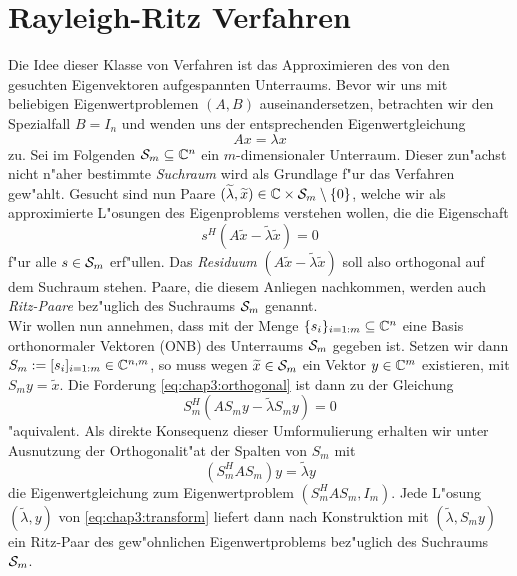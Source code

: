 \section{Rayleigh-Ritz Verfahren}\label{sec:chap3:rayleighRitz}
Die Idee dieser Klasse von Verfahren ist das Approximieren des von
den gesuchten Eigenvektoren aufgespannten Unterraums.
Bevor wir uns mit beliebigen Eigenwertproblemen $(A,B)$ auseinandersetzen, betrachten wir den Spezialfall $B=I_n$ und wenden uns der entsprechenden Eigenwertgleichung
\[
Ax = \lambda x
\]
zu. Sei im Folgenden $\S_m\subseteq\Cn$ ein $m$-dimensionaler Unterraum. Dieser zun"achst nicht
n"aher bestimmte \emph{Suchraum} wird als Grundlage f"ur das Verfahren gew"ahlt.
Gesucht sind nun Paare $(\widetilde{\lambda}, \widetilde{x})\in\C\times \S_m \setminus\{0\}$,
welche wir als approximierte L"osungen des Eigenproblems verstehen wollen, die
die Eigenschaft
\begin{equation}\label{eq:chap3:orthogonal}
s^H(A\widetilde{x} - \widetilde{\lambda}\widetilde{x})=0
\end{equation}
f"ur alle $s \in \S_m $ erf"ullen. Das \emph{Residuum} $(A\widetilde{x} - \widetilde{\lambda}\widetilde{x})$
soll also orthogonal auf dem Suchraum stehen. Paare, die diesem Anliegen nachkommen,
werden auch \emph{Ritz-Paare} bez"uglich des Suchraums $\S_m$ genannt.\\

Wir wollen nun annehmen, dass mit der Menge $\{s_i\}_{i=1:m}\subseteq \Cn$ eine Basis orthonormaler Vektoren (ONB) des Unterraums $\S_m$ gegeben ist. Setzen wir dann $S_m :=[s_i]_{i=1:m}\in\C^{n,m}$, so muss wegen $\widetilde{x}\in\S_m$
ein Vektor $y\in\C^m$ existieren, mit $S_m y = \widetilde{x}$. Die Forderung \eqref{eq:chap3:orthogonal}
ist dann zu der Gleichung
\[
S_m^H(AS_m y - \widetilde{\lambda} S_m y) = 0
\]
"aquivalent. Als direkte Konsequenz dieser Umformulierung erhalten wir unter Ausnutzung
der Orthogonalit"at der Spalten von $S_m$ mit
\begin{equation}\label{eq:chap3:transform}
(S_m^H A S_m) y = \widetilde{\lambda}y
\end{equation}
die Eigenwertgleichung zum Eigenwertproblem $(S_m^H A S_m, I_m)$. Jede L"osung $(\widetilde{\lambda},y)$ von \eqref{eq:chap3:transform}
liefert dann nach Konstruktion mit $(\widetilde{\lambda}, S_m y)$ ein Ritz-Paar des gew"ohnlichen
Eigenwertproblems bez"uglich des Suchraums $\S_m$.\\

